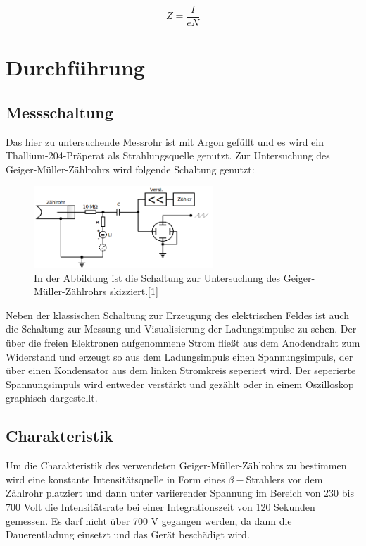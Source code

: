 \documentclass[titlepage = firstcover]{scrartcl}
\begin{document}
            \begin{equation}
                Z =  \frac{I}{eN}
                \label{eqn:Ladung}
            \end{equation}
    
    \newpage
    \section{Durchführung}
        \subsection{Messschaltung}
            Das hier zu untersuchende Messrohr ist mit Argon gefüllt und es wird ein Thallium-204-Präperat als Strahlungsquelle genutzt.
            Zur Untersuchung des Geiger-Müller-Zählrohrs wird folgende Schaltung genutzt:

            \FloatBarrier

                \begin{figure}[h]
                  \centering
                  \includegraphics[width = 0.6\textwidth]{Bilder/Messaufbau.png}
                  \caption{In der Abbildung ist die Schaltung zur Untersuchung des Geiger-Müller-Zählrohrs skizziert.[1]}
                  \label{fig:Messaufbau}
                \end{figure}

            \FloatBarrier
            \noindent
            Neben der klassischen Schaltung zur Erzeugung des elektrischen Feldes ist auch die Schaltung zur Messung und Visualisierung der Ladungsimpulse zu sehen. Der über die freien Elektronen
            aufgenommene Strom fließt aus dem Anodendraht zum Widerstand und erzeugt so aus dem Ladungsimpuls einen Spannungsimpuls, der über einen Kondensator aus dem linken Stromkreis seperiert wird.
            Der seperierte Spannungsimpuls wird entweder verstärkt und gezählt oder in einem Oszilloskop graphisch dargestellt.

        \subsection{Charakteristik}
            Um die Charakteristik des verwendeten Geiger-Müller-Zählrohrs zu bestimmen wird eine konstante Intensitätsquelle in Form eines $\beta-$Strahlers vor dem Zählrohr platziert und dann unter 
            variierender Spannung im Bereich von 230 bis 700 Volt die Intensitätsrate bei einer Integrationszeit von 120 Sekunden gemessen. Es darf nicht über 700 V gegangen werden, da dann die 
            Dauerentladung einsetzt und das Gerät beschädigt wird.
\end{document}
